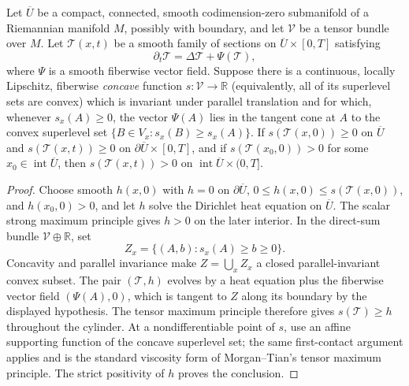 \begin{theorem}
\label{thm:strong-curvature-tensor-maximum-principle}
\notready
Let $\overline U$ be a compact, connected, smooth codimension-zero submanifold
of a Riemannian manifold $M$, possibly with boundary, and let $\mathcal V$ be
a tensor bundle over $M$.  Let $\mathcal T(x,t)$ be a smooth family of
sections on $\overline U\times[0,T]$ satisfying
\[
 \partial_t\mathcal T=\Delta\mathcal T+\Psi(\mathcal T),
\]
where $\Psi$ is a smooth fiberwise vector field.  Suppose there is a
continuous, locally Lipschitz, fiberwise \emph{concave} function
$s\colon\mathcal V\to\mathbb R$ (equivalently, all of its superlevel sets are
convex) which is invariant under parallel translation and for which, whenever
$s_x(A)\ge0$, the vector $\Psi(A)$ lies in the tangent cone at $A$ to the
convex superlevel set $\{B\in V_x:s_x(B)\ge s_x(A)\}$.  If
$s(\mathcal T(x,0))\ge0$ on $\overline U$ and
$s(\mathcal T(x,t))\ge0$ on $\partial\overline U\times[0,T]$, and if
$s(\mathcal T(x_0,0))>0$ for some $x_0\in\operatorname{int}\overline U$,
then $s(\mathcal T(x,t))>0$ on
$\operatorname{int}\overline U\times(0,T]$.
\end{theorem}

\begin{proof}
Choose smooth $h(x,0)$ with $h=0$ on $\partial\overline U$,
$0\le h(x,0)\le s(\mathcal T(x,0))$, and $h(x_0,0)>0$, and let $h$ solve
the Dirichlet heat equation on $\overline U$.  The scalar strong maximum
principle gives $h>0$ on the later interior.  In the direct-sum bundle
$\mathcal V\oplus\mathbb R$, set
\[
 Z_x=\{(A,b):s_x(A)\ge b\ge0\}.
\]
Concavity and parallel invariance make $Z=\bigcup_xZ_x$ a closed
parallel-invariant convex subset.
The pair $(\mathcal T,h)$ evolves by a heat equation plus the fiberwise vector
field $(\Psi(A),0)$, which is tangent to $Z$ along its boundary by the
displayed hypothesis.  The tensor maximum principle therefore gives
$s(\mathcal T)\ge h$ throughout the cylinder.  At a nondifferentiable point
of $s$, use an affine supporting function of the concave superlevel set; the
same first-contact argument applies and is the standard viscosity form of
Morgan--Tian's tensor maximum principle.  The strict positivity of $h$ proves
the conclusion.
\end{proof}

